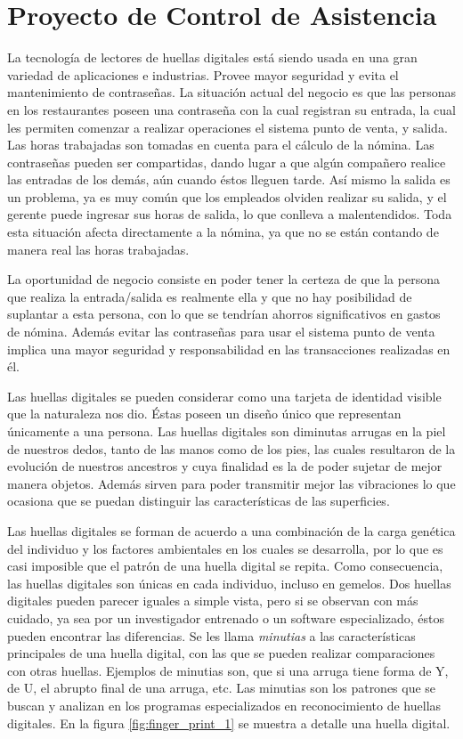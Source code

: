 

\chapter{Proyecto de Control de Asistencia}
\label{sec:fingerprint}

La tecnología de lectores de huellas digitales está siendo usada en una gran variedad de aplicaciones e industrias. Provee mayor seguridad y evita el mantenimiento de contraseñas. La situación actual del negocio es que las personas en los restaurantes poseen una contraseña con la cual registran su entrada, la cual les permiten comenzar a realizar operaciones el sistema punto de venta,  y salida. Las horas trabajadas son tomadas en cuenta para el cálculo de la nómina. Las contraseñas pueden ser compartidas, dando lugar a que algún compañero realice las entradas de los demás, aún cuando éstos lleguen tarde. Así mismo la salida es un problema, ya es muy común que los empleados olviden realizar su salida, y el gerente puede ingresar sus horas de salida, lo que conlleva a malentendidos. Toda esta situación afecta directamente a la nómina, ya que no se están contando de manera real las horas trabajadas.

La oportunidad de negocio consiste en poder tener la certeza de que la persona que realiza la entrada/salida es realmente ella y que no hay posibilidad de suplantar a esta persona, con lo que se tendrían ahorros significativos en gastos de nómina. Además evitar las contraseñas para usar el sistema punto de venta implica una mayor seguridad y responsabilidad en las transacciones realizadas en él.

Las huellas digitales se pueden considerar como una tarjeta de identidad visible que la naturaleza nos dio. Éstas poseen un diseño único que representan únicamente a una persona. Las huellas digitales son diminutas arrugas en la piel de nuestros dedos, tanto de las manos como de los pies, las cuales resultaron de la evolución de nuestros ancestros y cuya finalidad es la de poder sujetar de mejor manera objetos. Además sirven para poder transmitir mejor las vibraciones lo que ocasiona que se puedan distinguir las características de las superficies.

Las huellas digitales se forman de acuerdo a una combinación de la carga genética del individuo y los factores ambientales en los cuales se desarrolla, por lo que es casi imposible que el patrón de una huella digital se repita. Como consecuencia, las huellas digitales son únicas en cada individuo, incluso en gemelos. Dos huellas digitales pueden parecer iguales a simple vista, pero si se observan con más cuidado, ya sea por un investigador entrenado o un software especializado, éstos pueden encontrar las diferencias. Se les llama \textit{minutias} a las características principales de una huella digital, con las que se pueden realizar comparaciones con otras huellas. Ejemplos de minutias son, que si una arruga tiene forma de Y, de U, el abrupto final de una arruga, etc. Las minutias son los patrones que se buscan y analizan en los programas especializados en reconocimiento de huellas digitales. En la figura \ref{fig:finger_print_1} se muestra a detalle una huella digital.


